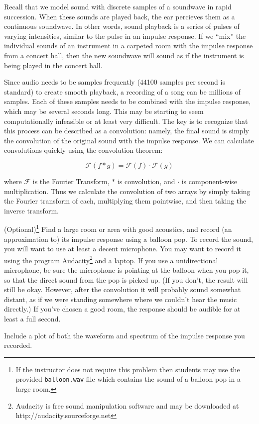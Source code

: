 Recall that we model sound with discrete samples of a soundwave in rapid succession.
When these sounds are played back, the ear percieves them as a continuous soundwave.
In other words, sound playback is a series of pulses of varying intensities, similar to the pulse in an impulse response.
If we ``mix'' the individual sounds of an instrument in a carpeted room with the impulse response from a concert hall, then the new soundwave will sound as if the instrument is being played in the concert hall.

Since audio needs to be samples frequently (44100 samples per second is standard) to create smooth playback, a recording of a song can be millions of samples.
Each of these samples needs to be combined with the impulse response, which may be several seconds long.
This may be starting to seem computationally infeasible or at least very difficult.
The key is to recognize that this process can be described as a convolution: namely, the final sound is simply the convolution of the original sound with the impulse response.
We can calculate convolutions quickly using the convolution theorem:

\[\mathcal{F}(f \ast g) = \mathcal{F}(f)\cdot\mathcal{F}(g)\]

where $\mathcal{F}$ is the Fourier Transform, $\ast$ is convolution, and $\cdot$ is component-wise multiplication.
Thus we calculate the convolution of two arrays by simply taking the Fourier transform of each, multiplying them pointwise, and then taking the inverse transform.

\begin{problem}
(Optional)\footnote{If the instructor does not require this problem then students may use the provided \texttt{balloon.wav} file which contains the sound of a balloon pop in a large room.} Find a large room or area with good acoustics, and record (an approximation to) its impulse response using a balloon pop.
To record the sound, you will want to use at least a decent microphone.
You may want to record it using the program Audacity\footnote{Audacity is free sound manipulation software and may be downloaded at http://audacity.sourceforge.net} and a laptop.
If you use a unidirectional microphone, be sure the microphone is pointing at the balloon when you pop it, so that the direct sound from the pop is picked up.
(If you don't, the result will still be okay.
However, after the convolution it will probably sound somewhat distant, as if we were standing somewhere where we couldn't hear the music directly.)
If you've chosen a good room, the response should be audible for at least a full second.

Include a plot of both the waveform and spectrum of the impulse response you recorded.
\end{problem}


